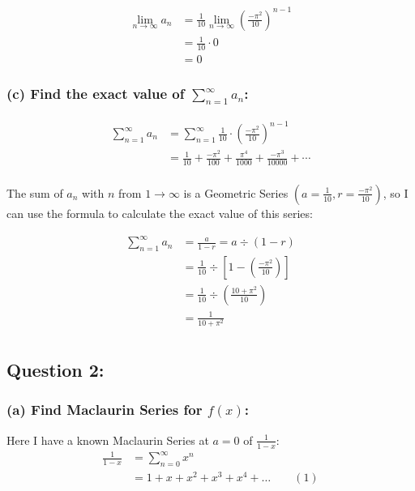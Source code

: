 \documentclass[12pt]{article}
\begin{document}
\begin{align*}
    \lim_{n\to \infty} a_n &= 
    \frac{1}{10} \lim_{n\to \infty} \left(\frac{-\pi^2}{10} \right)^{n-1} \\
    &= \frac{1}{10}\cdot 0 \\
    &= 0
\end{align*}




\subsubsection*{(c) Find the exact value of $\displaystyle \sum_{n=1}^{\infty} a_n$:}
\begin{align*}
    \sum_{n=1}^{\infty} a_n
    &= \sum_{n=1}^{\infty} \frac{1}{10}\cdot \left( \frac{-\pi^2}{10} \right)^{n-1} \\
    &= \frac{1}{10} + \frac{-\pi^2}{100}+ \frac{\pi^4}{1000}+ \frac{-\pi^3}{10000}+ \cdots\\
\end{align*}

\noindent The sum of $a_n$ with $n$ from $\displaystyle 1\to \infty$ is a Geometric Series $\displaystyle \left(a= \frac{1}{10}, r=\frac{-\pi^2}{10}\right)$, so I can use the formula to calculate the exact value of this series:

\begin{align*}
    \sum_{n=1}^{\infty} a_n &= \frac{a}{1-r}= a \div \left(1- r \right)\\
    &= \frac{1}{10}\div \left[ 1-\left( \frac{-\pi^2}{10} \right) \right]\\
    &= \frac{1}{10}\div \left(\frac{10+ \pi^2}{10} \right)\\
    &= \frac{1}{10+\pi^2}\\
\end{align*}





\vspace{1cm}

\subsection*{Question 2:}
\subsubsection*{(a) Find Maclaurin Series for $f(x)$:}

\noindent Here I have a known Maclaurin Series at $a=0$ of $\displaystyle \frac{1}{1-x}$:
\begin{align*}
    \frac{1}{1-x} &= \sum_{n=0}^{\infty} x^n\\
    &= 1+ x+ x^2+ x^3+ x^4+ \dots  \qquad (1)
\end{align*}
\end{document}
